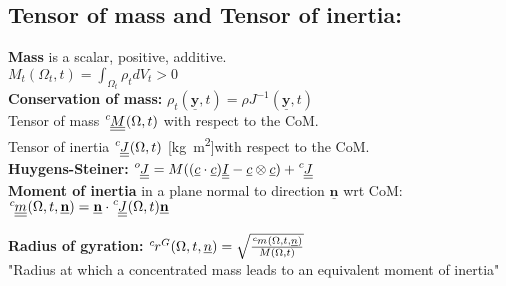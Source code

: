  \subsection*{Tensor of mass and Tensor of inertia:}
\smallskip
\textbf{Mass} is a scalar, positive, additive. \\
$M_t(\Omega_t, t) = \int_{\Omega_t} \rho_t dV_t > 0$ \\
\smallskip
\textbf{Conservation of mass:} $\rho_t(\underline{\mathbf{y}}, t) = \rho J^{-1}(\underline{\mathbf{y}},t)$ \\
Tensor of mass $\tensor[^c]{\underline{\underline{M}}}{}(\Omega, t)$ with respect to the CoM.\\

Tensor of inertia $\tensor[^c]{\underline{\underline{J}}}{}(\Omega, t)$ [\si{\kg\metre\squared}]with respect to the CoM. \\

\textbf{Huygens-Steiner:} $\tensor[^o]{\underline{\underline{J}}}{} = M ((\underline{c} \cdot \underline{c}) \underline{\underline{I}} - \underline{c} \otimes \underline{c}) + \tensor[^c]{\underline{\underline{J}}}{} $ \\

\textbf{Moment of inertia} in a plane normal to direction $\underline{\mathbf{n}}$ wrt CoM: \\
$\tensor[^c]{\underline{\underline{m}}}{}(\Omega, t, \underline{\mathbf{n}}) = \underline{\mathbf{n}} \cdot  \tensor[^c]{\underline{\underline{J}}}{}(\Omega, t)\underline{\mathbf{n}}$

\textbf{Radius of gyration:} $ \tensor[^c]{r}{^G}(\Omega, t, \underline{n}) = \sqrt{\frac{\tensor[^c]{m}{}(\Omega, t, \underline{n})} {M(\Omega, t)} }$ \\
"Radius at which a concentrated mass leads to an equivalent moment of inertia" \\